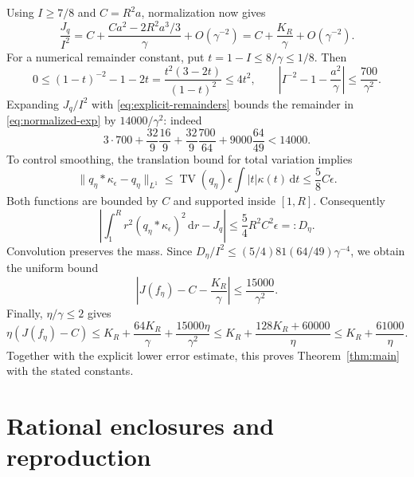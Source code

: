\documentclass[11pt,a4paper]{article}
\newcommand{\dd}{\,\mathrm d}
\newcommand{\TV}{\operatorname{TV}}
\numberwithin{equation}{section}
\begin{document}
Using \(I\ge7/8\) and \(C=R^2a\), normalization now gives
\begin{equation}\label{eq:normalized-exp}
 \frac{J_q}{I^2}
 =C+\frac{Ca^2-2R^2a^3/3}{\gamma}+O(\gamma^{-2})
 =C+\frac{K_R}{\gamma}+O(\gamma^{-2}).
\end{equation}
For a numerical remainder constant, put \(t=1-I\le8/\gamma\le1/8\).
Then
\[
 0\le(1-t)^{-2}-1-2t
 =\frac{t^2(3-2t)}{(1-t)^2}\le4t^2,
 \qquad
 \left|I^{-2}-1-\frac{a^2}{\gamma}\right|
 \le\frac{700}{\gamma^2}.
\]
Expanding \(J_q/I^2\) with \eqref{eq:explicit-remainders} bounds the
remainder in \eqref{eq:normalized-exp} by \(14000/\gamma^2\): indeed
\[
 3\cdot700+\frac{32}{9}\frac{16}{9}
 +\frac{32}{9}\frac{700}{64}+9000\frac{64}{49}<14000.
\]
To control smoothing, the translation bound for total variation implies
\[
 \|q_\eta*\kappa_\epsilon-q_\eta\|_{L^1}
 \le\TV(q_\eta)\epsilon\int |t|\kappa(t)\dd t
 \le\frac58 C\epsilon .
\]
Both functions are bounded by \(C\) and supported inside \([1,R]\).
Consequently
\begin{equation}\label{eq:smoothing-error}
 \left|\int_1^R r^2(q_\eta*\kappa_\epsilon)^2\dd r-J_q\right|
 \le \frac54R^2C^2\epsilon=:D_\eta .
\end{equation}
Convolution preserves the mass. Since
\(D_\eta/I^2\le(5/4)81(64/49)\gamma^{-4}\), we obtain the uniform bound
\[
 \left|J(f_\eta)-C-\frac{K_R}{\gamma}\right|
 \le\frac{15000}{\gamma^2}.
\]
Finally, \(\eta/\gamma\le2\) gives
\[
 \eta(J(f_\eta)-C)
 \le K_R+\frac{64K_R}{\gamma}+\frac{15000\eta}{\gamma^2}
 \le K_R+\frac{128K_R+60000}{\eta}
 \le K_R+\frac{61000}{\eta}.
\]
Together with the explicit lower error estimate, this proves
Theorem~\ref{thm:main} with the stated constants.

\section{Rational enclosures and reproduction}\label{sec:numerics}
\end{document}

